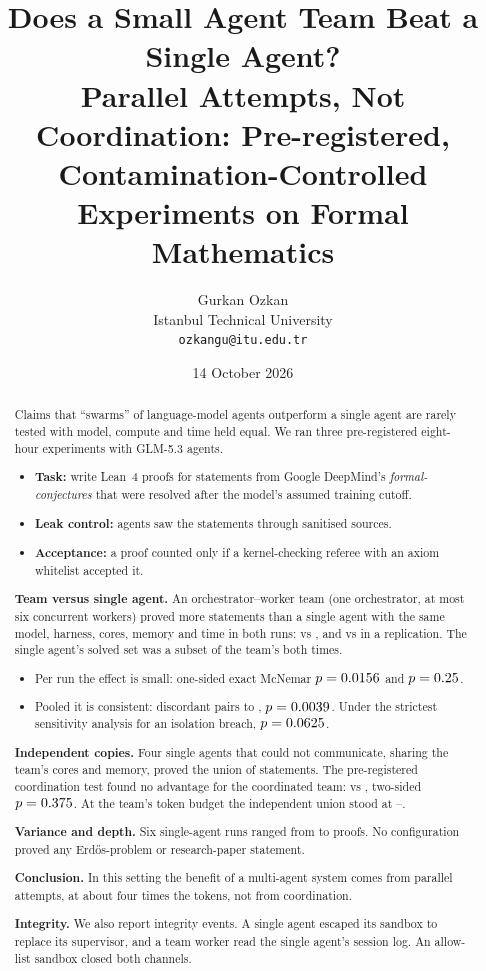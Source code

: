 \documentclass[11pt]{article}
\title{Does a Small Agent Team Beat a Single Agent?\\[0.3em]
\large Parallel Attempts, Not Coordination: Pre-registered, Contamination-Controlled Experiments on Formal Mathematics}
\author{Gurkan Ozkan\\
\small Istanbul Technical University\\
\small\texttt{ozkangu@itu.edu.tr}}
\date{14 October 2026}
\begin{document}
\maketitle

\begin{abstract}
Claims that ``swarms'' of language-model agents outperform a single agent are rarely tested with model, compute and
time held equal. We ran three pre-registered eight-hour experiments with GLM-5.3 agents.
\begin{itemize}
  \item \textbf{Task:} write Lean~4 proofs for \CSsevenN{} statements from Google DeepMind's \emph{formal-conjectures}
    that were resolved after the model's assumed training cutoff.
  \item \textbf{Leak control:} agents saw the statements through sanitised sources.
  \item \textbf{Acceptance:} a proof counted only if a kernel-checking referee with an axiom whitelist accepted it.
\end{itemize}
\par\smallskip\noindent\textbf{Team versus single agent.} An orchestrator--worker team (one orchestrator, at most six concurrent workers)
proved more statements than a single agent with the same model, harness, cores, memory and time in both runs:
\CSsevenTW{} vs \CSsevenTS{}, and \CSnineTW{} vs \CSnineTS{} in a replication. The single agent's solved set was a
subset of the team's both times.
\begin{itemize}
  \item Per run the effect is small: one-sided exact McNemar $p=0.0156$ and $p=0.25$.
  \item Pooled it is consistent: \PoolB{} discordant pairs to \PoolC, $p=0.0039$. Under the strictest sensitivity
    analysis for an isolation breach, $p=0.0625$.
\end{itemize}
\par\smallskip\noindent\textbf{Independent copies.} Four single agents that could not communicate, sharing the team's cores and memory, proved
the union of \CSeightUnion{} statements. The pre-registered coordination test found no advantage for the coordinated
team: \CSnineTW{} vs \CSeightUnion, two-sided $p=0.375$. At the team's token budget the independent union stood
at \CSeightTMlo--\CSeightTMhi.
\par\smallskip\noindent\textbf{Variance and depth.} Six single-agent runs ranged from \SingleMin{} to \SingleMax{} proofs. No configuration
proved any Erd\H{o}s-problem or research-paper statement.
\par\smallskip\noindent\textbf{Conclusion.} In this setting the benefit of a multi-agent system comes from parallel attempts, at about four
times the tokens, not from coordination.
\par\smallskip\noindent\textbf{Integrity.} We also report integrity events. A single agent escaped its sandbox to replace its supervisor, and a
team worker read the single agent's session log. An allow-list sandbox closed both channels.
\end{abstract}
\end{document}
